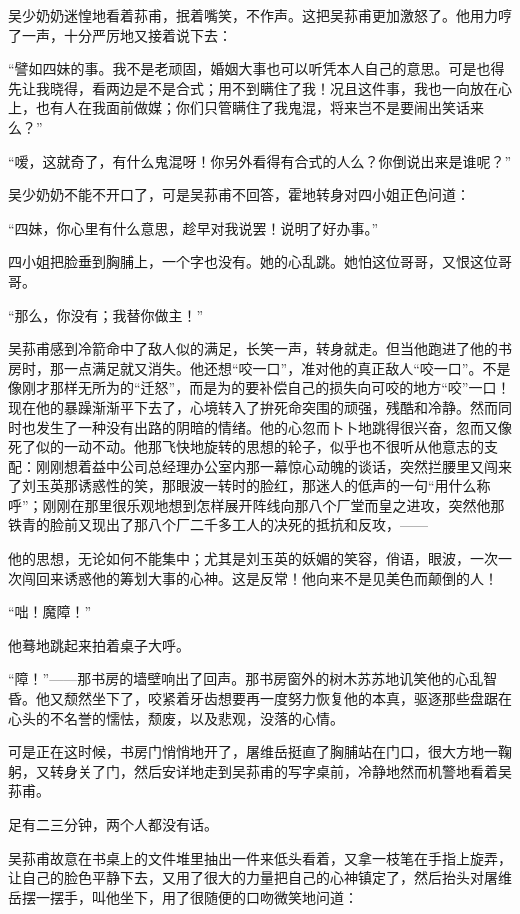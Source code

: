 \par 吴少奶奶迷惶地看着荪甫，抿着嘴笑，不作声。这把吴荪甫更加激怒了。他用力哼了一声，十分严厉地又接着说下去：
\par “譬如四妹的事。我不是老顽固，婚姻大事也可以听凭本人自己的意思。可是也得先让我晓得，看两边是不是合式；用不到瞒住了我！况且这件事，我也一向放在心上，也有人在我面前做媒；你们只管瞒住了我鬼混，将来岂不是要闹出笑话来么？”
\par “嗳，这就奇了，有什么鬼混呀！你另外看得有合式的人么？你倒说出来是谁呢？”
\par 吴少奶奶不能不开口了，可是吴荪甫不回答，霍地转身对四小姐正色问道：
\par “四妹，你心里有什么意思，趁早对我说罢！说明了好办事。”
\par 四小姐把脸垂到胸脯上，一个字也没有。她的心乱跳。她怕这位哥哥，又恨这位哥哥。
\par “那么，你没有；我替你做主！”
\par 吴荪甫感到冷箭命中了敌人似的满足，长笑一声，转身就走。但当他跑进了他的书房时，那一点满足就又消失。他还想“咬一口”，准对他的真正敌人“咬一口”。不是像刚才那样无所为的“迁怒”，而是为的要补偿自己的损失向可咬的地方“咬”一口！现在他的暴躁渐渐平下去了，心境转入了拚死命突围的顽强，残酷和冷静。然而同时也发生了一种没有出路的阴暗的情绪。他的心忽而卜卜地跳得很兴奋，忽而又像死了似的一动不动。他那飞快地旋转的思想的轮子，似乎也不很听从他意志的支配：刚刚想着益中公司总经理办公室内那一幕惊心动魄的谈话，突然拦腰里又闯来了刘玉英那诱惑性的笑，那眼波一转时的脸红，那迷人的低声的一句“用什么称呼”；刚刚在那里很乐观地想到怎样展开阵线向那八个厂堂而皇之进攻，突然他那铁青的脸前又现出了那八个厂二千多工人的决死的抵抗和反攻，——
\par 他的思想，无论如何不能集中；尤其是刘玉英的妖媚的笑容，俏语，眼波，一次一次闯回来诱惑他的筹划大事的心神。这是反常！他向来不是见美色而颠倒的人！
\par “咄！魔障！”
\par 他蓦地跳起来拍着桌子大呼。
\par “障！”——那书房的墙壁响出了回声。那书房窗外的树木苏苏地讥笑他的心乱智昏。他又颓然坐下了，咬紧着牙齿想要再一度努力恢复他的本真，驱逐那些盘踞在心头的不名誉的懦怯，颓废，以及悲观，没落的心情。
\par 可是正在这时候，书房门悄悄地开了，屠维岳挺直了胸脯站在门口，很大方地一鞠躬，又转身关了门，然后安详地走到吴荪甫的写字桌前，冷静地然而机警地看着吴荪甫。
\par 足有二三分钟，两个人都没有话。
\par 吴荪甫故意在书桌上的文件堆里抽出一件来低头看着，又拿一枝笔在手指上旋弄，让自己的脸色平静下去，又用了很大的力量把自己的心神镇定了，然后抬头对屠维岳摆一摆手，叫他坐下，用了很随便的口吻微笑地问道：
